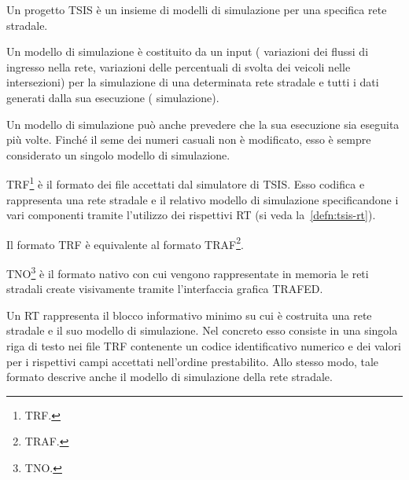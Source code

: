 \begin{definizione}\label{defn:tsis-proj}
Un progetto \acs{TSIS} è un insieme di modelli di simulazione per una specifica rete stradale.
\end{definizione}

\begin{definizione}\label{defn:tsis-sim-model}
Un modello di simulazione è costituito da un input (\eg{} variazioni dei flussi di ingresso nella rete, variazioni delle percentuali di svolta dei veicoli nelle intersezioni) per la simulazione di una determinata rete stradale e tutti i dati generati dalla sua esecuzione (\ie{} simulazione).
\end{definizione}
\begin{osservazione}
Un modello di simulazione può anche prevedere che la sua esecuzione sia eseguita più volte. Finché il seme dei numeri casuali non è modificato, esso è sempre considerato un singolo modello di simulazione.
\end{osservazione}

\begin{definizione}\label{defn:trf-format}
\acs{TRF}\footnote{\acf{TRF}.} è il formato dei file accettati dal simulatore di \acs{TSIS}. Esso codifica e rappresenta una rete stradale e il relativo modello di simulazione specificandone i vari componenti tramite l'utilizzo dei rispettivi \acs{RT} (si veda la~\vref{defn:tsis-rt}).
\end{definizione}
\begin{osservazione}
Il formato \acs{TRF} è equivalente al formato \acs{TRAF}\footnote{\acf{TRAF}.}.
\end{osservazione}

\begin{definizione}\label{defn:tno-format}
\acs{TNO}\footnote{\acf{TNO}.} è il formato nativo con cui vengono rappresentate in memoria le reti stradali create visivamente tramite l'interfaccia grafica \acs{TRAFED}.
\end{definizione}

\begin{definizione}[\acl{RT}]\label{defn:tsis-rt}
Un \acf{RT} rappresenta il blocco informativo minimo su cui è costruita una rete stradale e il suo modello di simulazione. Nel concreto esso consiste in una singola riga di testo nei file \acs{TRF} contenente un codice identificativo numerico e dei valori per i rispettivi campi accettati nell'ordine prestabilito. Allo stesso modo, tale formato descrive anche il modello di simulazione della rete stradale.
\end{definizione}

